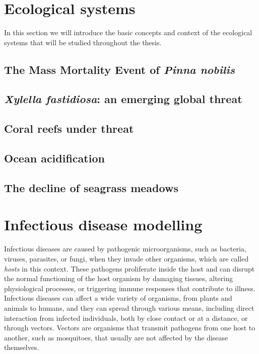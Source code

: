 
\section{\label{sec:Ecological systems} Ecological
  systems}

In this section we will introduce the basic concepts and context of the
ecological systems that will be studied throughout the thesis.

\subsection{\label{sec:The Mass Mortality Event of Pinna nobilis} The Mass
  Mortality Event of \textit{Pinna nobilis}}

\subsection{\label{sec:Xylella fastidiosa: an emerging global
    threat}\textit{Xylella
    fastidiosa}: an emerging global threat}

\subsection{\label{sec:Coral reefs under threat} Coral reefs under threat}

\subsection{\label{sec:Ocean acidification} Ocean acidification}

\subsection{\label{sec:The decline of seagrass meadows} The decline of seagrass
  meadows}

\newpage
\section{\label{sec:Infectious disease modelling} Infectious
  disease modelling}

Infectious diseases are caused by pathogenic microorganisms, such as
bacteria, viruses, parasites, or fungi, when they invade other organisms, which
are called \textit{hosts} in this context. These pathogens proliferate inside
the host and can disrupt the normal functioning of the host organism by
damaging tissues, altering physiological processes, or triggering immune
responses that contribute to illness. Infectious diseases can affect a wide
variety of organisms, from plants and animals to humans, and they can spread
through various means, including direct interaction from infected individuals,
both by close contact or at a distance, or through vectors. Vectors are
organisms that transmit pathogens from one host to another, such as mosquitoes,
that usually are not affected by the disease themselves.

